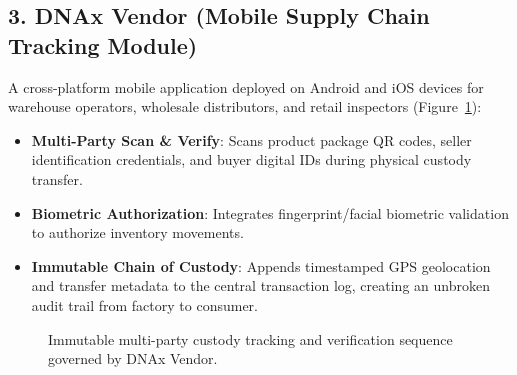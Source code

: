 \subsection{3. DNAx Vendor\textsuperscript{\textcopyright} (Mobile Supply Chain Tracking Module)}
A cross-platform mobile application deployed on Android and iOS devices for warehouse operators, wholesale distributors, and retail inspectors (Figure~\ref{fig:vendor_app}):
\begin{itemize}
    \item \textbf{Multi-Party Scan \& Verify}: Scans product package QR codes, seller identification credentials, and buyer digital IDs during physical custody transfer.
    \item \textbf{Biometric Authorization}: Integrates fingerprint/facial biometric validation to authorize inventory movements.
    \item \textbf{Immutable Chain of Custody}: Appends timestamped GPS geolocation and transfer metadata to the central transaction log, creating an unbroken audit trail from factory to consumer.
\end{itemize}

\begin{figure}[H]
    \centering
    \caption{Immutable multi-party custody tracking and verification sequence governed by DNAx Vendor.}
    \label{fig:vendor_app}
\end{figure}

